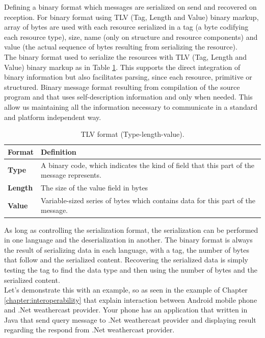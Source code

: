 Defining a binary format which messages are serialized on send and recovered on reception. For binary format using TLV (Tag, Length and Value) binary markup\citep{asn1:opt}, array of bytes are used with each resource serialized in a tag (a byte codifying each resource type), size, name (only on structure and resource components) and value (the actual sequence of bytes resulting from serializing the resource).\\

The binary format used to serialize the resources with TLV (Tag, Length and Value) binary markup as in Table \ref{tab:tvl}. This supports the direct integration of binary information but also facilitates parsing, since each resource, primitive or structured. Binary message format resulting from compilation of the source program and that uses self-description information and only when needed. This allow us maintaining all the information necessary to communicate in a standard and platform independent way.\\


\begin{table}
\centering
\begin{tabular}{ p{5.50cm} p{5.50cm} }
\toprule
\multicolumn{1}{l}{\textbf{Format}} & \textbf{Definition}\\
\midrule
\textbf{Type}  &  A binary code, which indicates the kind of field that this part of the message represents.\\
\textbf{Length} & The size of the value field in bytes \\
\textbf{Value} & Variable-sized series of bytes which contains data for this part of the message.\\

\bottomrule
\end{tabular}
\caption[TLV format (Type-length-value).]{TLV format (Type-length-value).}
\label{tab:tvl}
\end{table}


As long as controlling the serialization format, the serialization can be performed in one language and the
deserialization in another. The binary format is always the result of serializing data in each language, with a tag, the number of bytes that follow and the serialized content. Recovering the serialized data is simply testing the tag to find the data type and then using the number of bytes and the serialized content.\\

Let’s demonstrate this with an example, so as seen in the example of Chapter \ref{chapter:interoperability} that explain interaction between Android mobile phone and .Net weathercast provider. Your phone has an application that written in Java that send query message to .Net weathercast provider and displaying result regarding the respond from .Net weathercast provider.\\

